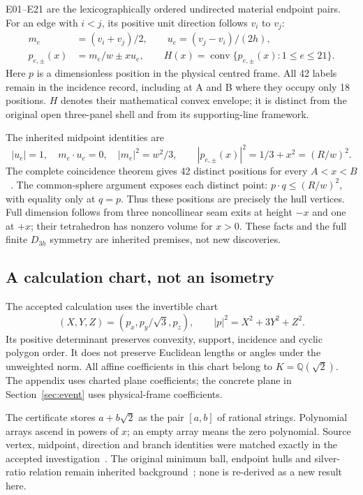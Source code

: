 \documentclass[11pt,a4paper]{article}
\newcommand{\conv}{\operatorname{conv}}
\theoremstyle{definition}
\begin{document}
E01--E21 are the lexicographically ordered undirected material endpoint pairs. For an edge with $i<j$, its positive unit direction follows $v_i$ to $v_j$:
\begin{equation}\label{eq:family}
\begin{split}
m_e&=(v_i+v_j)/2,\qquad u_e=(v_j-v_i)/(2h),\\
p_{e,\pm}(x)&=m_e/w\pm xu_e,\qquad
H(x)=\conv\{p_{e,\pm}(x):1\le e\le21\}.
\end{split}
\end{equation}
Here $p$ is a dimensionless position in the physical centred frame. All 42 labels remain in the incidence record, including at A and B where they occupy only 18 positions. $H$ denotes their mathematical convex envelope; it is distinct from the original open three-panel shell and from its supporting-line framework.

The inherited midpoint identities are
\begin{equation}\label{eq:sphere}
|u_e|=1,\quad m_e\cdot u_e=0,\quad |m_e|^2=w^2/3,
\qquad |p_{e,\pm}(x)|^2=1/3+x^2=(R/w)^2.
\end{equation}
The complete coincidence theorem gives 42 distinct positions for every $A<x<B$~\cite[Sections 4--6]{parent}. The common-sphere argument exposes each distinct point: $p\cdot q\le (R/w)^2$, with equality only at $q=p$. Thus these positions are precisely the hull vertices. Full dimension follows from three noncollinear seam exits at height $-x$ and one at $+x$; their tetrahedron has nonzero volume for $x>0$. These facts and the full finite $D_{3h}$ symmetry are inherited premises, not new discoveries.

\subsection{A calculation chart, not an isometry}\label{sec:chart}
The accepted calculation uses the invertible chart
\begin{equation}\label{eq:chart}
(X,Y,Z)=(p_x,p_y/\sqrt3,p_z),\qquad
|p|^2=X^2+3Y^2+Z^2.
\end{equation}
Its positive determinant preserves convexity, support, incidence and cyclic polygon order. It does not preserve Euclidean lengths or angles under the unweighted norm. All affine coefficients in this chart belong to $K=\mathbb Q(\sqrt2)$. The appendix uses charted plane coefficients; the concrete plane in Section~\ref{sec:event} uses physical-frame coefficients.

The certificate stores $a+b\sqrt2$ as the pair $[a,b]$ of rational strings. Polynomial arrays ascend in powers of $x$; an empty array means the zero polynomial. Source vertex, midpoint, direction and branch identities were matched exactly in the accepted investigation~\cite[Sections 1--2]{investigation}. The original minimum ball, endpoint hulls and silver-ratio relation remain inherited background~\cite{parent}; none is re-derived as a new result here.
\end{document}
